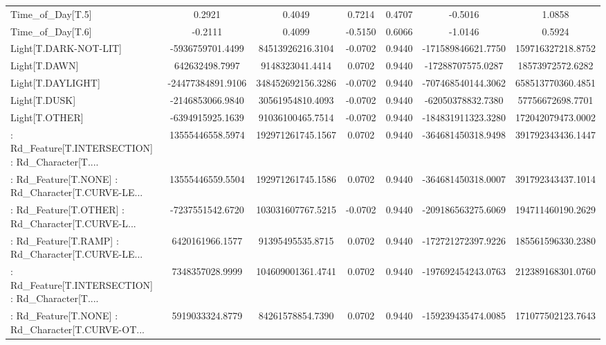 \begin{longtable}{p{4cm}cccccc}
Time\_of\_Day[T.5]                                   &            0.2921 &            0.4049 &  0.7214 &       0.4707 &            -0.5016 &            1.0858 \\
Time\_of\_Day[T.6]                                   &           -0.2111 &            0.4099 & -0.5150 &       0.6066 &            -1.0146 &            0.5924 \\
Light[T.DARK-NOT-LIT]                              &  -5936759701.4499 &  84513926216.3104 & -0.0702 &       0.9440 & -171589846621.7750 & 159716327218.8752 \\
Light[T.DAWN]                                      &    642632498.7997 &   9148323041.4414 &  0.0702 &       0.9440 &  -17288707575.0287 &  18573972572.6282 \\
Light[T.DAYLIGHT]                                  & -24477384891.9106 & 348452692156.3286 & -0.0702 &       0.9440 & -707468540144.3062 & 658513770360.4851 \\
Light[T.DUSK]                                      &  -2146853066.9840 &  30561954810.4093 & -0.0702 &       0.9440 &  -62050378832.7380 &  57756672698.7701 \\
Light[T.OTHER]                                     &  -6394915925.1639 &  91036100465.7514 & -0.0702 &       0.9440 & -184831911323.3280 & 172042079473.0002 \\
 : Rd\_Feature[T.INTERSECTION] : Rd\_Character[T.... &  13555446558.5974 & 192971261745.1567 &  0.0702 &       0.9440 & -364681450318.9498 & 391792343436.1447 \\
 : Rd\_Feature[T.NONE] : Rd\_Character[T.CURVE-LE... &  13555446559.5504 & 192971261745.1586 &  0.0702 &       0.9440 & -364681450318.0007 & 391792343437.1014 \\
 : Rd\_Feature[T.OTHER] : Rd\_Character[T.CURVE-L... &  -7237551542.6720 & 103031607767.5215 & -0.0702 &       0.9440 & -209186563275.6069 & 194711460190.2629 \\
 : Rd\_Feature[T.RAMP] : Rd\_Character[T.CURVE-LE... &   6420161966.1577 &  91395495535.8715 &  0.0702 &       0.9440 & -172721272397.9226 & 185561596330.2380 \\
 : Rd\_Feature[T.INTERSECTION] : Rd\_Character[T.... &   7348357028.9999 & 104609001361.4741 &  0.0702 &       0.9440 & -197692454243.0763 & 212389168301.0760 \\
 : Rd\_Feature[T.NONE] : Rd\_Character[T.CURVE-OT... &   5919033324.8779 &  84261578854.7390 &  0.0702 &       0.9440 & -159239435474.0085 & 171077502123.7643 \\

\end{longtable}
